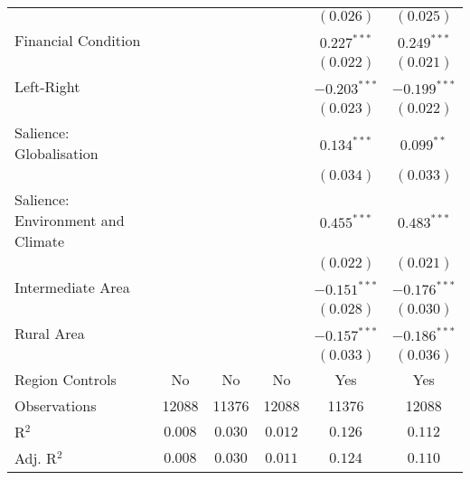 \begin{center}
\begin{tiny}
\begin{longtable}{l@{} c@{} c@{} c@{} c@{} c@{}}
                                                &                &                &                & $(0.026)$      & $(0.025)$        \\
\quad Financial Condition                       &                &                &                & $0.227^{***}$  & $0.249^{***}$    \\
                                                &                &                &                & $(0.022)$      & $(0.021)$        \\
\quad Left-Right                                &                &                &                & $-0.203^{***}$ & $-0.199^{***}$   \\
                                                &                &                &                & $(0.023)$      & $(0.022)$        \\
\quad Salience: Globalisation                   &                &                &                & $0.134^{***}$  & $0.099^{**}$     \\
                                                &                &                &                & $(0.034)$      & $(0.033)$        \\
\quad Salience: Environment and Climate         &                &                &                & $0.455^{***}$  & $0.483^{***}$    \\
                                                &                &                &                & $(0.022)$      & $(0.021)$        \\
\quad Intermediate Area                         &                &                &                & $-0.151^{***}$ & $-0.176^{***}$   \\
                                                &                &                &                & $(0.028)$      & $(0.030)$        \\
\quad Rural Area                                &                &                &                & $-0.157^{***}$ & $-0.186^{***}$   \\
                                                &                &                &                & $(0.033)$      & $(0.036)$        \\
\hline
Region Controls                                 & No             & No             & No             & Yes            & Yes              \\
Observations                                    & 12088          & 11376          & 12088          & 11376          & 12088            \\
R$^2$                                           & $0.008$        & $0.030$        & $0.012$        & $0.126$        & $0.112$          \\
Adj. R$^2$                                      & $0.008$        & $0.030$        & $0.011$        & $0.124$        & $0.110$          \\
\end{longtable}
\end{tiny}
\end{center}
